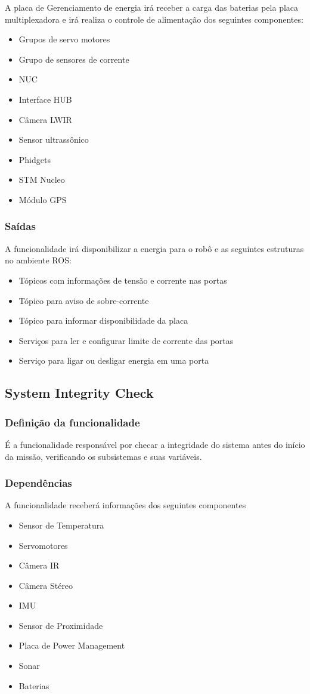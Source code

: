 A placa de Gerenciamento de energia irá receber a carga das baterias pela placa multiplexadora e irá realiza o controle de alimentação dos seguintes componentes:
\begin{itemize}
	\item Grupos de servo motores
	\item Grupo de sensores de corrente
	\item NUC
	\item Interface HUB
	\item Câmera LWIR
	\item Sensor ultrassônico
	\item Phidgets
	\item STM Nucleo
	\item Módulo GPS
\end{itemize}

\subsubsection{Saídas}
A funcionalidade irá disponibilizar a energia para o robô e as seguintes estruturas no ambiente ROS:
\begin{itemize}
	\item Tópicos com informações de tensão e corrente nas portas
	\item Tópico para aviso de sobre-corrente
	\item Tópico para informar disponibilidade da placa
	\item Serviços para ler e configurar limite de corrente das portas
	\item Serviço para ligar ou desligar energia em uma porta	
\end{itemize}

\subsection{System Integrity Check}
\label{ssec:check}

\subsubsection{Definição da funcionalidade}
É a funcionalidade responsável por checar a integridade do sistema antes do início da missão, verificando os subsistemas e suas variáveis.

\subsubsection{Dependências}
A funcionalidade receberá informações dos seguintes componentes
\begin{itemize}
	\item Sensor de Temperatura
	\item Servomotores
	\item Câmera IR
	\item Câmera Stéreo
	\item IMU
	\item Sensor de Proximidade
	\item Placa de Power Management
	\item Sonar 
	\item Baterias
\end{itemize}

